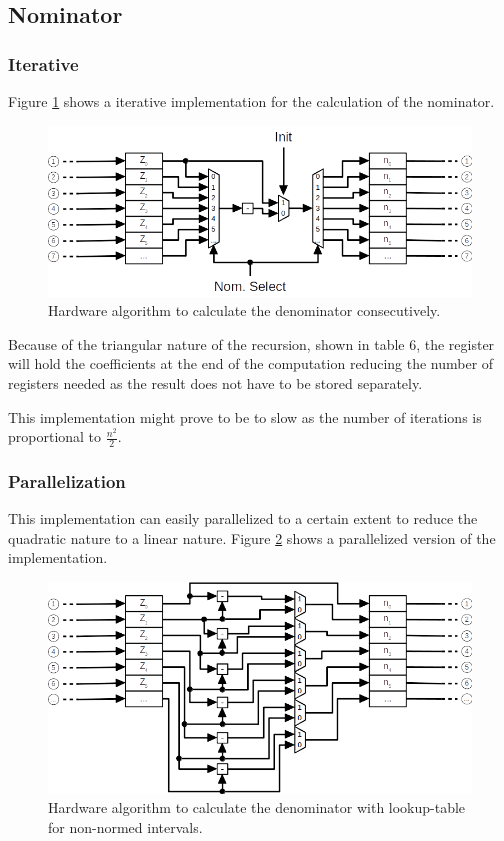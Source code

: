 \subsection{Nominator}

\subsubsection{Iterative}
Figure \ref{fig:y-algo:iter} shows a iterative implementation for the
calculation of the nominator.

\begin{figure}[H]
	\centering
	\includegraphics[width=.8\textwidth]{content/results/y-algo_iterative.png}
	\caption{Hardware algorithm to calculate the denominator consecutively.}
	\label{fig:y-algo:iter}
\end{figure}

Because of the triangular nature of the recursion, shown in table 6, the
register will hold the coefficients at the end of the computation reducing the
number of registers needed as the result does not have to be stored separately.

This implementation might prove to be to slow as the number of iterations is
proportional to $\frac{n^2}{2}$.



\subsubsection{Parallelization}
This implementation can easily parallelized to a certain extent to reduce the
quadratic nature to a linear nature. Figure \ref{fig:y-algo:parallel} shows a
parallelized version of the implementation.

\begin{figure}[H]
	\centering
	\includegraphics[width=.8\textwidth]{content/results/y-algo_parallel.png}
	\caption{Hardware algorithm to calculate the denominator with
		lookup-table for non-normed intervals.}
	\label{fig:y-algo:parallel}
\end{figure}

